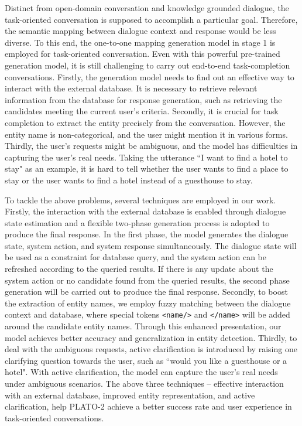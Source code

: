 \documentclass[letterpaper]{article} \usepackage{aaai21}  \usepackage{times}  \usepackage{helvet} \usepackage{courier}  \usepackage[hyphens]{url}  \usepackage{graphicx} \urlstyle{rm} \def\UrlFont{\rm}  \usepackage{natbib}  \usepackage{caption} \frenchspacing  \setlength{\pdfpagewidth}{8.5in}  \setlength{\pdfpageheight}{11in}  \usepackage{amsmath}
\begin{document}
Distinct from open-domain conversation and knowledge grounded dialogue, the task-oriented conversation is supposed to accomplish a particular goal. Therefore, the semantic mapping between dialogue context and response would be less diverse. To this end, the one-to-one mapping generation model in stage 1 is employed for task-oriented conversation. Even with this powerful pre-trained generation model, it is still challenging to carry out end-to-end task-completion conversations. Firstly, the generation model needs to find out an effective way to interact with the external database. It is necessary to retrieve relevant information from the database for response generation, such as retrieving the candidates meeting the current user's criteria. Secondly, it is crucial for task completion to extract the entity precisely from the conversation. However, the entity name is non-categorical, and the user might mention it in various forms. Thirdly, the user's requests might be ambiguous, and the model has difficulties in capturing the user's real needs. Taking the utterance ``I want to find a hotel to stay" as an example, it is hard to tell whether the user wants to find a place to stay or the user wants to find a hotel instead of a guesthouse to stay. 

To tackle the above problems, several techniques are employed in our work. Firstly, the interaction with the external database is enabled through dialogue state estimation \cite{ham2020end} and a flexible two-phase generation process is adopted to produce the final response. In the first phase, the model generates the dialogue state, system action, and system response simultaneously. The dialogue state will be used as a constraint for database query, and the system action can be refreshed according to the queried results. If there is any update about the system action or no candidate found from the queried results, the second phase generation will be carried out to produce the final response. Secondly, to boost the extraction of entity names, we employ fuzzy matching between the dialogue context and database, where special tokens \texttt{<name/>} and \texttt{</name>} will be added around the candidate entity names. Through this enhanced presentation, our model achieves better accuracy and generalization in entity detection. Thirdly, to deal with the ambiguous requests, active clarification is introduced by raising one clarifying question towards the user, such as ``would you like a guesthouse or a hotel". With active clarification, the model can capture the user's real needs under ambiguous scenarios. The above three techniques -- effective interaction with an external database, improved entity representation, and active clarification, help PLATO-2 achieve a better success rate and user experience in task-oriented conversations. 
\end{document}
